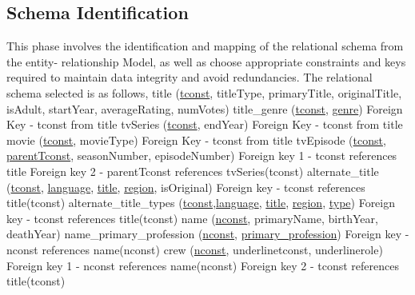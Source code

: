 \documentclass{sig-alternate}
\begin{document}
	\subsection{Schema Identification}
	This phase involves the identification and mapping of the relational schema from the entity- relationship Model, as well as choose appropriate constraints and keys required to maintain data integrity and avoid redundancies. The relational schema selected is as follows,\newline
	title (\underline{tconst}, titleType, primaryTitle, originalTitle, isAdult, startYear, averageRating, numVotes)\newline
	title\_genre (\underline{tconst}, \underline{genre}) \newline
	Foreign Key - tconst from title \newline
	tvSeries (\underline{tconst}, endYear)\newline
	Foreign Key - tconst from title\newline
	movie (\underline{tconst}, movieType)\newline
	Foreign Key - tconst from title\newline
	tvEpisode (\underline{tconst}, \underline{parentTconst}, seasonNumber, episodeNumber)\newline
	Foreign key 1 - tconst references title\newline
	Foreign key 2 - parentTconst references tvSeries(tconst)\newline
	alternate\_title (\underline{tconst}, \underline{language}, \underline{title}, \underline{region}, isOriginal) \newline
	Foreign key - tconst references title(tconst)\newline
	alternate\_title\_types (\underline{tconst},\underline{language}, \underline{title}, \underline{region}, \underline{type}) \newline
	Foreign key - tconst references title(tconst)\newline
	name (\underline{nconst}, primaryName, birthYear, deathYear) \newline
	name\_primary\_profession (\underline{nconst}, \underline{primary\_profession}) \newline
	Foreign key - nconst references name(nconst)\newline
	crew (\underline{nconst}, underline{tconst}, underline{role}) \newline
	Foreign key 1 - nconst references name(nconst) \newline
	Foreign key 2 - tconst references title(tconst) \newline
\end{document}
